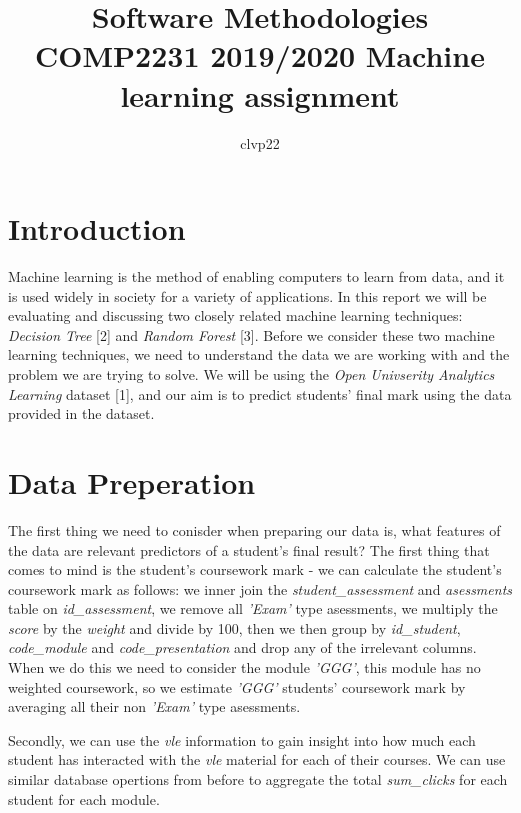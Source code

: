 \documentclass[8pt]{article}
\title{Software Methodologies COMP2231 2019/2020 Machine learning assignment}
\author{clvp22}
\begin{document}
\maketitle
\section{Introduction}
Machine learning is the method of enabling computers to learn from data, and it is used widely in society for a variety of applications. In this report we will be evaluating and discussing two closely related machine learning techniques: \textit{Decision Tree} [2] and \textit{Random Forest} [3]. Before we consider these two machine learning techniques, we need to understand the data we are working with and the problem we are trying to solve. We will be using the \textit{Open Univserity Analytics Learning} dataset [1], and our aim is to predict students' final mark using the data provided in the dataset.
\section{Data Preperation}
The first thing we need to conisder when preparing our data is, what features of the data are relevant predictors of a student's final result? The first thing that comes to mind is the student's coursework mark - we can calculate the student's coursework mark as follows: we inner join the \textit{student\_assessment} and \textit{asessments} table on \textit{id\_assessment}, we remove all \textit{'Exam'} type asessments, we multiply the \textit{score} by the \textit{weight} and divide by 100, then we then group by \textit{id\_student}, \textit{code\_module} and \textit{code\_presentation} and drop any of the irrelevant columns. When we do this we need to consider the module \textit{'GGG'}, this module has no weighted coursework, so we estimate \textit{'GGG'} students' coursework mark by averaging all their non \textit{'Exam'} type asessments.

Secondly, we can use the \textit{vle} information to gain insight into how much each student has interacted with the \textit{vle} material for each of their courses. We can use similar database opertions from before to aggregate the total \textit{sum\_clicks} for each student for each module. 
\end{document}
